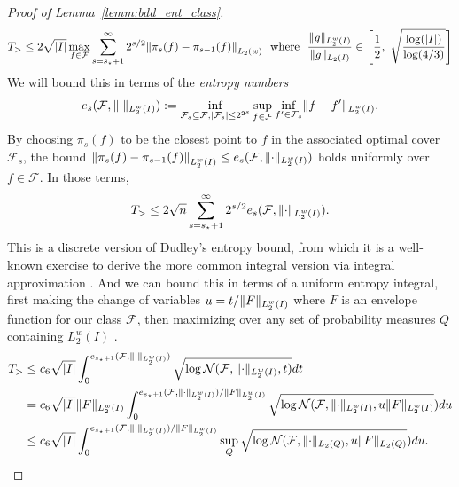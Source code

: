 \documentclass{article}
\DeclarePairedDelimiter\norm{\lVert}{\rVert}
\DeclarePairedDelimiter\abs{\lvert}{\rvert}
\theoremstyle{definition}
\newcommand{\calF}{\ensuremath{\mathcal{F}}}
\newcommand{\calN}{\ensuremath{\mathcal{N}}}
\newcommand{\F}{\ensuremath{\mathcal{F}}}
\newcommand{\<}{\langle}
\renewcommand{\>}{\rangle}
\begin{document}
\begin{refsection}
\begin{proof}[Proof of Lemma~\ref{lemm:bdd_ent_class}]
$$
\begin{aligned}
T_{>}
&\le 2\sqrt{\abs{I}} \max_{f \in \calF} \sum_{s = s_\star+1}^{\infty} 2^{s/2}\norm*{\pi_s(f) - \pi_{s-1}(f)}_{L_2(w)} \ \text{ where } \ \frac{\norm{g}_{L_2^w(I)}} {\norm{g}_{L_2(I)}} \in \left[\frac{1}{2}, \ \sqrt{\frac{\log(\abs{I})}{\log(4/3)}} \right] \\
\end{aligned}
$$
We will bound this in terms of the \emph{entropy numbers}
$$
e_s(\calF, \norm{\cdot}_{L_2^w(I)}) := \inf_{\calF_s \subseteq \calF, \abs{\calF_s} \le 2^{2^s}} \sup_{f \in \calF} \inf_{f' \in \calF_s}\norm{f-f'}_{L_2^w(I)}.
$$
By choosing $\pi_s(f)$ to be the closest point to $f$ in the associated optimal cover $\calF_s$,
the bound $\norm*{\pi_s(f) - \pi_{s-1}(f)}_{L_2^w(I)} \le e_s(\calF, \norm{\cdot}_{L_2^w(I)})$ holds uniformly over $f \in \F$. In those terms,
$$
T_{>} \le 2\sqrt{n}\sum_{s = s_\star+1}^{\infty} 2^{s/2} e_s(\calF, \norm{\cdot}_{L_2^w(I)}).
$$
This is a discrete version of Dudley's entropy bound, from which it is a well-known exercise to derive the more common integral version via integral approximation \citep[e.g.][Remarks after Proposition 2.5.1]{talagrand2014upper}. And we can bound this in terms of a uniform entropy integral, first making the change of variables $u=t/\norm{F}_{L_2^w(I)}$ where $F$ is an envelope function for our class $\F$, then maximizing over any set of probability measures $Q$ containing $L_2^w(I)$ \citep[see e.g. the proof of][Theorem 2.5.2]{van1996weak}.
\begin{equation}
\begin{aligned}
T_{>}
&\le c_6 \sqrt{\abs{I}}\int_0^{e_{s_\star + 1}(\calF, \norm{\cdot}_{L_2^w(I)})} \sqrt{\log\calN(\calF, \norm{\cdot}_{L_2^w(I)}, t)} dt \\
&= c_6   \sqrt{\abs{I}}\norm{F}_{L_2^w(I)} \int_0^{e_{s_\star + 1}(\calF, \norm{\cdot}_{L_2^w(I)})/\norm{F}_{L_2^w(I)}} \sqrt{\log\calN(\calF, \norm{\cdot}_{L_2^w(I)}, u\norm{F}_{L_2^w(I)}}) du \\
&\le c_6 \sqrt{\abs{I}}\int_0^{e_{s_\star + 1}(\calF, \norm{\cdot}_{L_2^w(I)})/\norm{F}_{L_2^w(I)}} \sup_{Q} \sqrt{\log\calN(\calF, \norm{\cdot}_{L_2(Q)}, u\norm{F}_{L_2(Q)}}) du.
\end{aligned}
\end{equation}


\end{proof}
\end{refsection}
\end{document}
